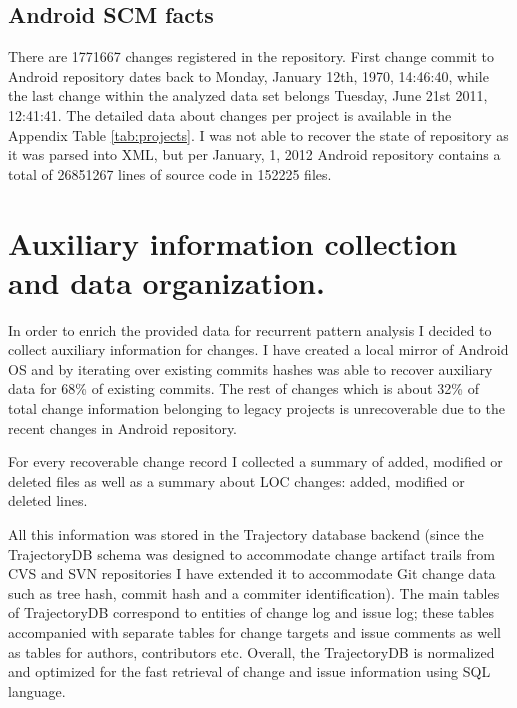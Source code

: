 \documentclass[a4paper,10pt]{article}
\numberwithin{equation}{subsection}
\begin{document}
\subsection{Android SCM facts}
There are 1771667 changes registered in the repository. First change commit to Android repository dates back 
to Monday, January 12th, 1970, 14:46:40, while the last change within the analyzed data set belongs Tuesday, 
June 21st 2011, 12:41:41. The detailed data about changes per project is available in the Appendix Table 
\ref{tab:projects}. I was not able to recover the state of repository as it was parsed into XML, but 
per January, 1, 2012 Android repository contains a total of 26851267 lines of source code in 152225 files. 

\section{Auxiliary information collection and data organization.}
In order to enrich the provided data for recurrent pattern analysis I decided to collect auxiliary 
information for changes. I have created a local mirror of Android OS and by iterating over existing 
commits hashes was able to recover auxiliary data for 68\% of existing commits. The rest 
of changes which is about 32\% of total change information belonging to legacy projects is 
unrecoverable due to the recent changes in Android repository. 

For every recoverable change record I collected a summary of added, modified or deleted files 
as well as a summary about LOC changes: added, modified or deleted lines.

All this information was stored in the Trajectory database backend (since the TrajectoryDB schema
was designed to accommodate change artifact trails from CVS and SVN repositories I have extended
it to accommodate Git change data such as tree hash, commit hash and a commiter identification).
The main tables of TrajectoryDB correspond to entities of change log and issue log; these tables 
accompanied with separate tables for change targets and issue comments as well as tables for
authors, contributors etc. Overall, the TrajectoryDB is normalized and optimized for the fast 
retrieval of change and issue information using SQL language.
\end{document}
